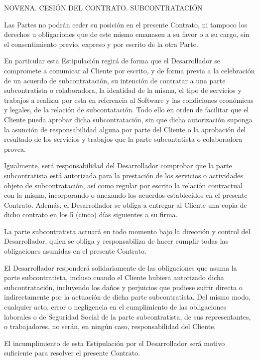 \documentclass[a4paper,11pt]{report}
\begin{document}
	NOVENA. CESIÓN DEL CONTRATO. SUBCONTRATACIÓN
	
	Las Partes no podrán ceder su posición en el presente Contrato, ni
	tampoco los derechos u obligaciones que de este mismo emanasen a su
	favor o a su cargo, sin el consentimiento previo, expreso y por escrito
	de la otra Parte.
	
	En particular esta Estipulación regirá de forma que el Desarrollador se
	compromete a comunicar al Cliente por escrito, y de forma previa a la
	celebración de un acuerdo de subcontratación, su intención de contratar
	a una parte subcontratista o colaboradora, la identidad de la misma, el
	tipo de servicios y trabajos a realizar por esta en referencia al
	Software y las condiciones económicas y legales, de la relación de
	subcontatación. Todo ello en orden de facilitar que el Cliente pueda
	aprobar dicha subcontratación, sin que dicha autorización suponga la
	asunción de responsabilidad alguna por parte del Cliente o la aprobación
	del resultado de los servicios y trabajos que la parte subcontatista o
	colaboradora provea.
	
	Igualmente, será responsabilidad del Desarrollador comprobar que la
	parte subcontratista está autorizada para la prestación de los servicios
	o actividades objeto de subcontratación, así como regular por escrito la
	relación contractual con la misma, incorporando o anexando los acuerdos
	establecidos en el presente Contrato. Además, el Desarrollador se obliga
	a entregar al Cliente una copia de dicho contrato en los 5 (cinco) días
	siguientes a su firma.
	
	La parte subcontratista actuará en todo momento bajo la dirección y
	control del Desarrollador, quien se obliga y responsabiliza de hacer
	cumplir todas las obligaciones asumidas en el presente Contrato.
	
	El Desarrollador responderá solidariamente de las obligaciones que asuma
	la parte subcontratista, incluso cuando el Cliente hubiera autorizado
	dicha subcontratación, incluyendo los daños y perjuicios que pudiese
	sufrir directa o indirectamente por la actuación de dicha parte
	subcontratista. Del mismo modo, cualquier acto, error o negligencia en
	el cumplimiento de las obligaciones laborales o de Seguridad Social de
	la parte subcontratista, de sus representantes, o trabajadores, no
	serán, en ningún caso, responsabilidad del Cliente.
	
	El incumplimiento de esta Estipulación por el Desarrollador será motivo
	suficiente para resolver el presente Contrato.
	
\end{document}
